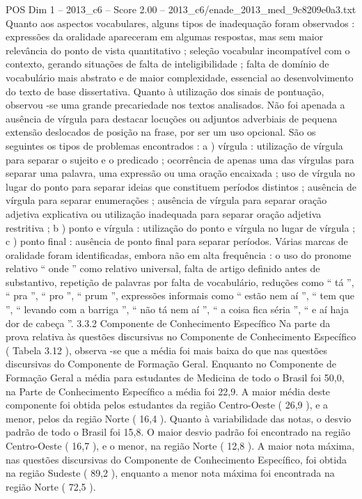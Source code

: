 \begin{textsample}{POS Dim 1 – 2013\_c6 – Score 2.00 – 2013\_c6/enade\_2013\_med\_9c8209e0a3.txt}
Quanto aos aspectos vocabulares, alguns tipos de inadequação foram observados : expressões da oralidade apareceram em algumas respostas, mas sem maior relevância do ponto de vista quantitativo ; seleção vocabular incompatível com o contexto, gerando situações de falta de inteligibilidade ; falta de domínio de vocabulário mais abstrato e de maior complexidade, essencial ao desenvolvimento do texto de base dissertativa.
Quanto à utilização dos sinais de pontuação, observou -se uma grande precariedade nos textos analisados.
Não foi apenada a ausência de vírgula para destacar locuções ou adjuntos adverbiais de pequena extensão deslocados de posição na frase, por ser um uso opcional.
São os seguintes os tipos de problemas encontrados : a ) vírgula : utilização de vírgula para separar o sujeito e o predicado ; ocorrência de apenas uma das vírgulas para separar uma palavra, uma expressão ou uma oração encaixada ; uso de vírgula no lugar do ponto para separar ideias que constituem períodos distintos ; ausência de vírgula para separar enumerações ; ausência de vírgula para separar oração adjetiva explicativa ou utilização inadequada para separar oração adjetiva restritiva ; b ) ponto e vírgula : utilização do ponto e vírgula no lugar de vírgula ; c ) ponto final : ausência de ponto final para separar períodos.
Várias marcas de oralidade foram identificadas, embora não em alta frequência : o uso do pronome relativo “ onde ” como relativo universal, falta de artigo definido antes de substantivo, repetição de palavras por falta de vocabulário, reduções como “ tá ”, “ pra ”, “ pro ”, “ prum ”, expressões informais como “ estão nem aí ”, “ tem que ”, “ levando com a barriga ”, “ não tá nem aí ”, “ a coisa fica séria ”, “ e aí haja dor de cabeça ”. 3.3.2 Componente de Conhecimento Específico Na parte da prova relativa às questões discursivas no Componente de Conhecimento Específico ( Tabela 3.12 ), observa -se que a média foi mais baixa do que nas questões discursivas do Componente de Formação Geral.
Enquanto no Componente de Formação Geral a média para estudantes de Medicina de todo o Brasil foi 50,0, na Parte de Conhecimento Específico a média foi 22,9.
A maior média deste componente foi obtida pelos estudantes da região Centro-Oeste ( 26,9 ), e a menor, pelos da região Norte ( 16,4 ).
Quanto à variabilidade das notas, o desvio padrão de todo o Brasil foi 15,8.
O maior desvio padrão foi encontrado na região Centro-Oeste ( 16,7 ), e o menor, na região Norte ( 12,8 ).
A maior nota máxima, nas questões discursivas do Componente de Conhecimento Específico, foi obtida na região Sudeste ( 89,2 ), enquanto a menor nota máxima foi encontrada na região Norte ( 72,5 ).

\end{textsample}
